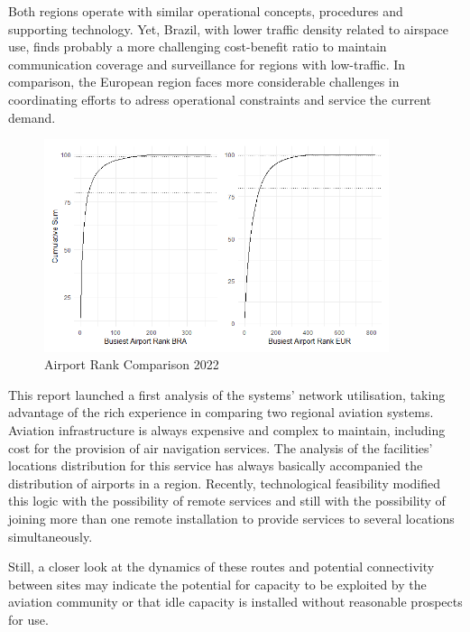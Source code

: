 \documentclass[
  a4paper,
  DIV=11,
  numbers=noendperiod]{scrreport}
\begin{document}
Both regions operate with similar operational concepts, procedures and
supporting technology. Yet, Brazil, with lower traffic density related
to airspace use, finds probably a more challenging cost-benefit ratio to
maintain communication coverage and surveillance for regions with
low-traffic. In comparison, the European region faces more considerable
challenges in coordinating efforts to adress operational constraints and
service the current demand.

\begin{figure}[H]

{\centering \includegraphics[width=0.9\textwidth,height=\textheight]{././figures/p_cumsum_tot.png}

}

\caption{\label{fig-Apt-Rank-Comparison2022}Airport Rank Comparison
2022}

\end{figure}

This report launched a first analysis of the systems' network
utilisation, taking advantage of the rich experience in comparing two
regional aviation systems. Aviation infrastructure is always expensive
and complex to maintain, including cost for the provision of air
navigation services. The analysis of the facilities' locations
distribution for this service has always basically accompanied the
distribution of airports in a region. Recently, technological
feasibility modified this logic with the possibility of remote services
and still with the possibility of joining more than one remote
installation to provide services to several locations simultaneously.

Still, a closer look at the dynamics of these routes and potential
connectivity between sites may indicate the potential for capacity to be
exploited by the aviation community or that idle capacity is installed
without reasonable prospects for use.
\end{document}
